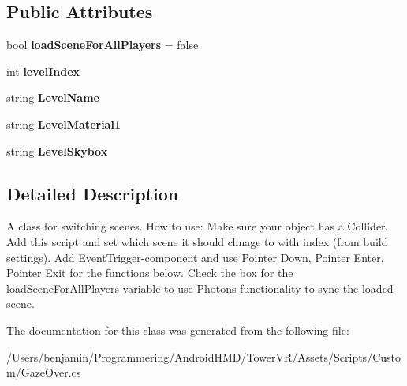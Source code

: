 \subsection*{Public Attributes}
\begin{DoxyCompactItemize}
\item 
bool {\bfseries load\+Scene\+For\+All\+Players} = false\hypertarget{class_gaze_over_a1f3d93693093000a182971f54abea678}{}\label{class_gaze_over_a1f3d93693093000a182971f54abea678}

\item 
int {\bfseries level\+Index}\hypertarget{class_gaze_over_a4da14b1f14785e43084c6f5adeb7e641}{}\label{class_gaze_over_a4da14b1f14785e43084c6f5adeb7e641}

\item 
string {\bfseries Level\+Name}\hypertarget{class_gaze_over_a737fc0bbf32691a235d632475daab772}{}\label{class_gaze_over_a737fc0bbf32691a235d632475daab772}

\item 
string {\bfseries Level\+Material1}\hypertarget{class_gaze_over_abaa5c39e1a53eeda5e00a1727da499c6}{}\label{class_gaze_over_abaa5c39e1a53eeda5e00a1727da499c6}

\item 
string {\bfseries Level\+Skybox}\hypertarget{class_gaze_over_ae0fffd931b90309c155a73342ab4c50f}{}\label{class_gaze_over_ae0fffd931b90309c155a73342ab4c50f}

\end{DoxyCompactItemize}


\subsection{Detailed Description}
A class for switching scenes. How to use\+: Make sure your object has a Collider. Add this script and set which scene it should chnage to with index (from build settings). Add Event\+Trigger-\/component and use Pointer Down, Pointer Enter, Pointer Exit for the functions below. Check the box for the load\+Scene\+For\+All\+Players variable to use Photons functionality to sync the loaded scene. 

The documentation for this class was generated from the following file\+:\begin{DoxyCompactItemize}
\item 
/\+Users/benjamin/\+Programmering/\+Android\+H\+M\+D/\+Tower\+V\+R/\+Assets/\+Scripts/\+Custom/Gaze\+Over.\+cs\end{DoxyCompactItemize}

